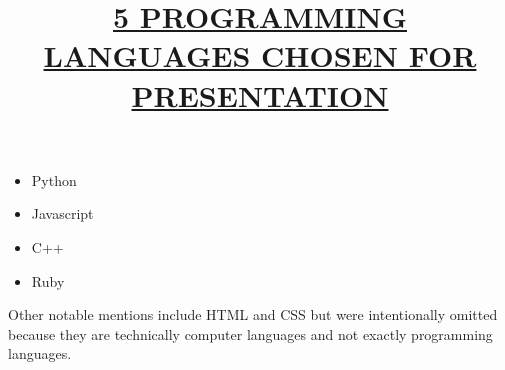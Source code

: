 \documentclass{article}
\begin{document}
	\title{\underline{5 PROGRAMMING LANGUAGES CHOSEN FOR PRESENTATION}} 
	\maketitle
	 \begin{itemize}
		\item Python
			\item Javascript
				\item C++
					\item Ruby
	\end{itemize}
	
	   Other notable mentions include HTML and CSS but were intentionally omitted because they are technically computer languages and not exactly programming languages.
\end{document}
